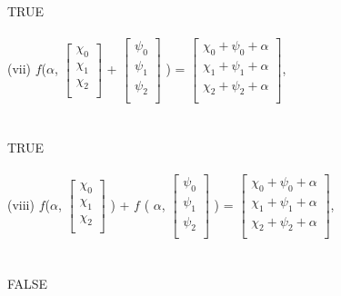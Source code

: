 \documentclass[11pt]{article}
\begin{document}
\\
\\
\\
TRUE
\\
\\
(vii)
$f$($\alpha$,
$
\begin{bmatrix}
{\chi_{0}}\\
{\chi_{1}}\\
{\chi_{2}}\\
\end{bmatrix}$
+
$
\begin{bmatrix}
{\psi_{0}}\\
{\psi_{1}}\\
{\psi_{2}}\\
\end{bmatrix}$
)
=
$
\begin{bmatrix}
{\chi_{0} + \psi_{0} + \alpha}\\
{\chi_{1} + \psi_{1} + \alpha}\\
{\chi_{2} + \psi_{2} + \alpha}\\
\end{bmatrix}$,
\\
\\
\\
TRUE
\\
\\
(viii)
$f$($\alpha$,
$
\begin{bmatrix}
{\chi_{0}}\\
{\chi_{1}}\\
{\chi_{2}}\\
\end{bmatrix}$
)
+
$f$
(
$\alpha$,
$
\begin{bmatrix}
{\psi_{0}}\\
{\psi_{1}}\\
{\psi_{2}}\\
\end{bmatrix}$
)
=
$
\begin{bmatrix}
{\chi_{0} + \psi_{0} + \alpha}\\
{\chi_{1} + \psi_{1} + \alpha}\\
{\chi_{2} + \psi_{2} + \alpha}\\
\end{bmatrix}$,
\\
\\
\\
FALSE
\end{document}
